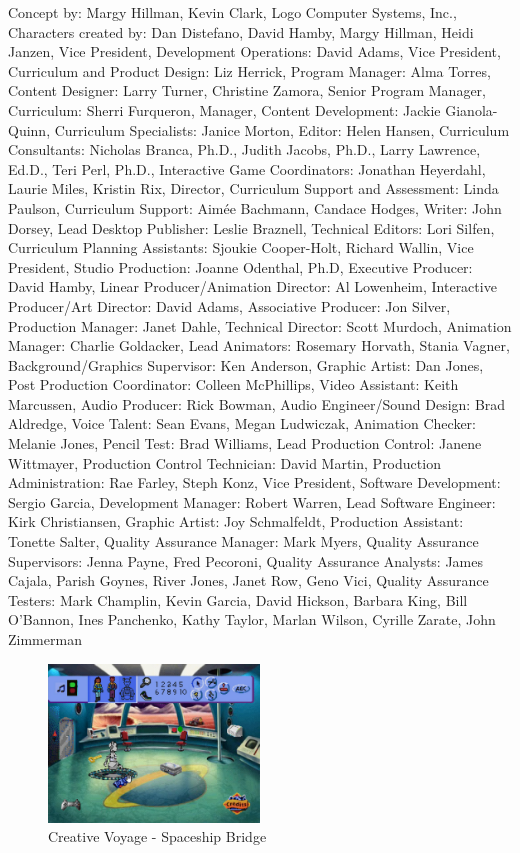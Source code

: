 Concept by: Margy Hillman, Kevin Clark, Logo Computer Systems, Inc.,
Characters created by: Dan Distefano, David Hamby, Margy Hillman, Heidi Janzen,
Vice President, Development Operations: David Adams,
Vice President, Curriculum and Product Design: Liz Herrick,
Program Manager: Alma Torres,
Content Designer: Larry Turner, Christine Zamora,
Senior Program Manager, Curriculum: Sherri Furqueron,
Manager, Content Development: Jackie Gianola-Quinn,
Curriculum Specialists: Janice Morton,
Editor: Helen Hansen,
Curriculum Consultants: Nicholas Branca, Ph.D., Judith Jacobs, Ph.D., Larry Lawrence, Ed.D., Teri Perl, Ph.D.,
Interactive Game Coordinators: Jonathan Heyerdahl, Laurie Miles, Kristin Rix,
Director, Curriculum Support and Assessment: Linda Paulson,
Curriculum Support: Aimée Bachmann, Candace Hodges,
Writer: John Dorsey,
Lead Desktop Publisher: Leslie Braznell,
Technical Editors: Lori Silfen,
Curriculum Planning Assistants: Sjoukie Cooper-Holt, Richard Wallin,
Vice President, Studio Production: Joanne Odenthal, Ph.D,
Executive Producer: David Hamby,
Linear Producer/Animation Director: Al Lowenheim,
Interactive Producer/Art Director: David Adams,
Associative Producer: Jon Silver,
Production Manager: Janet Dahle,
Technical Director: Scott Murdoch,
Animation Manager: Charlie Goldacker,
Lead Animators: Rosemary Horvath, Stania Vagner,
Background/Graphics Supervisor: Ken Anderson,
Graphic Artist: Dan Jones,
Post Production Coordinator: Colleen McPhillips,
Video Assistant: Keith Marcussen,
Audio Producer: Rick Bowman,
Audio Engineer/Sound Design: Brad Aldredge,
Voice Talent: Sean Evans, Megan Ludwiczak,
Animation Checker: Melanie Jones,
Pencil Test: Brad Williams,
Lead Production Control: Janene Wittmayer,
Production Control Technician: David Martin,
Production Administration: Rae Farley, Steph Konz,
Vice President, Software Development: Sergio Garcia,
Development Manager: Robert Warren,
Lead Software Engineer: Kirk Christiansen,
Graphic Artist: Joy Schmalfeldt,
Production Assistant: Tonette Salter,
Quality Assurance Manager: Mark Myers,
Quality Assurance Supervisors: Jenna Payne, Fred Pecoroni,
Quality Assurance Analysts: James Cajala, Parish Goynes, River Jones, Janet Row, Geno Vici,
Quality Assurance Testers: Mark Champlin, Kevin Garcia, David Hickson, Barbara King, Bill O'Bannon, Ines Panchenko, Kathy Taylor, Marlan Wilson, Cyrille Zarate, John Zimmerman

\begin{figure}[H]
    \centering
    \includegraphics[width=0.5\textwidth]{"./Games/Creative/Images/CreativeVoyageScreenshot1.jpg"}
    \caption{Creative Voyage - Spaceship Bridge}
\end{figure}

